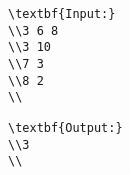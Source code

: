 \begin{verbatim}
\textbf{Input:}
\\3 6 8
\\3 10
\\7 3
\\8 2
\\\end{verbatim}
\begin{itemize}
\end{itemize}
\begin{verbatim}
\textbf{Output:}
\\3
\\\end{verbatim}